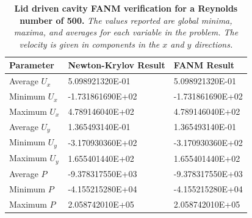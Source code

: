 \begin{table}[h!]
  \begin{center}
    \begin{tabular}{lll}\hline\hline
      \multicolumn{1}{l}{Parameter}& 
      \multicolumn{1}{l}{Newton-Krylov Result}&
      \multicolumn{1}{l}{FANM Result}\\
      \hline
      Average $U_x$ & 5.098921320E-01 & 5.098921320E-01 \\
      Minimum $U_x$ & -1.731861690E+02 & -1.731861690E+02 \\
      Maximum $U_x$ & 4.789146040E+02 & 4.789146040E+02 \\
      \hline
      Average $U_y$ & 1.365493140E-01 & 1.365493140E-01 \\
      Minimum $U_y$ & -3.170930360E+02 & -3.170930360E+02 \\
      Maximum $U_y$ & 1.655401440E+02 & 1.655401440E+02 \\
      \hline
      Average $P$ & -9.378317550E+03 & -9.378317550E+03 \\
      Minimum $P$ & -4.155215280E+04 & -4.155215280E+04 \\
      Maximum $P$ & 2.058742010E+05 & 2.058742010E+05 \\
      \hline\hline
    \end{tabular}
  \end{center}
  \caption{\textbf{Lid driven cavity FANM verification for a
      Reynolds number of 500.} \textit{The values reported are
      global minima, maxima, and averages for each variable in the
      problem. The velocity is given in components in the $x$ and $y$
      directions.}}
  \label{tab:driven_re500_results}
\end{table}

